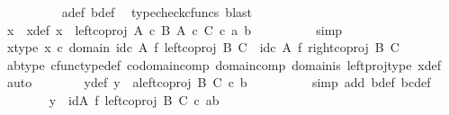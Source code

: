 \begin{isabellebody}
\ \ \ \ \ \ \ \ \isamarkupfalse%
\ a{\isacharunderscore}{\kern0pt}def\ b{\isacharunderscore}{\kern0pt}def\ \isamarkupfalse%
\ {\isacharparenleft}{\kern0pt}typecheck{\isacharunderscore}{\kern0pt}cfuncs{\isacharcomma}{\kern0pt}\ blast{\isacharparenright}{\kern0pt}\isanewline
\ \ \ \ \ \ \isamarkupfalse%
\ x\ \ x{\isacharunderscore}{\kern0pt}def{\isacharcolon}{\kern0pt}\ {\isachardoublequoteopen}x\ {\isacharequal}{\kern0pt}\ left{\isacharunderscore}{\kern0pt}coproj\ {\isacharparenleft}{\kern0pt}A\ {\isasymtimes}\isactrlsub c\ B{\isacharparenright}{\kern0pt}\ {\isacharparenleft}{\kern0pt}A\ {\isasymtimes}\isactrlsub c\ C{\isacharparenright}{\kern0pt}\ {\isasymcirc}\isactrlsub c\ {\isasymlangle}a{\isacharcomma}{\kern0pt}\ b{\isasymrangle}{\isachardoublequoteclose}\isanewline
\ \ \ \ \ \ \ \ \isamarkupfalse%
\ simp\isanewline
\ \ \ \ \ \ \isamarkupfalse%
\ x{\isacharunderscore}{\kern0pt}type{\isacharcolon}{\kern0pt}\ {\isachardoublequoteopen}x\ {\isasymin}\isactrlsub c\ domain\ {\isacharparenleft}{\kern0pt}{\isacharparenleft}{\kern0pt}id\isactrlsub c\ A\ {\isasymtimes}\isactrlsub f\ left{\isacharunderscore}{\kern0pt}coproj\ B\ C{\isacharparenright}{\kern0pt}\ {\isasymamalg}\ {\isacharparenleft}{\kern0pt}id\isactrlsub c\ A\ {\isasymtimes}\isactrlsub f\ right{\isacharunderscore}{\kern0pt}coproj\ B\ C{\isacharparenright}{\kern0pt}{\isacharparenright}{\kern0pt}{\isachardoublequoteclose}\isanewline
\ \ \ \ \ \ \ \ \isamarkupfalse%
\ ab{\isacharunderscore}{\kern0pt}type\ cfunc{\isacharunderscore}{\kern0pt}type{\isacharunderscore}{\kern0pt}def\ codomain{\isacharunderscore}{\kern0pt}comp\ domain{\isacharunderscore}{\kern0pt}comp\ domain{\isacharunderscore}{\kern0pt}is\ left{\isacharunderscore}{\kern0pt}proj{\isacharunderscore}{\kern0pt}type\ x{\isacharunderscore}{\kern0pt}def\ \isamarkupfalse%
\ auto\isanewline
\ \ \ \ \ \ \isamarkupfalse%
\ y{\isacharunderscore}{\kern0pt}def{}{\isacharcolon}{\kern0pt}\ {\isachardoublequoteopen}y\ {\isacharequal}{\kern0pt}\ {\isasymlangle}a{\isacharcomma}{\kern0pt}left{\isacharunderscore}{\kern0pt}coproj\ B\ C\ {\isasymcirc}\isactrlsub c\ b{\isasymrangle}{\isachardoublequoteclose}\isanewline
\ \ \ \ \ \ \ \ \isamarkupfalse%
\ {\isacharparenleft}{\kern0pt}simp\ add{\isacharcolon}{\kern0pt}\ b{\isacharunderscore}{\kern0pt}def\ bc{\isacharunderscore}{\kern0pt}def{\isacharparenright}{\kern0pt}\isanewline
\ \ \ \ \ \ \isamarkupfalse%
\ {\isachardoublequoteopen}y\ {\isacharequal}{\kern0pt}\ {\isacharparenleft}{\kern0pt}id{\isacharparenleft}{\kern0pt}A{\isacharparenright}{\kern0pt}\ {\isasymtimes}\isactrlsub f\ left{\isacharunderscore}{\kern0pt}coproj\ B\ C{\isacharparenright}{\kern0pt}\ {\isasymcirc}\isactrlsub c\ {\isasymlangle}a{\isacharcomma}{\kern0pt}b{\isasymrangle}{\isachardoublequoteclose}\isanewline

\end{isabellebody}
